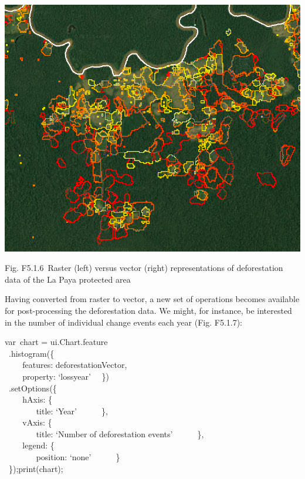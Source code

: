 \documentclass[
  letterpaper,
  DIV=11,
  numbers=noendperiod]{scrreprt}
\begin{document}
\includegraphics{./F5/image13.png}

Fig. F5.1.6~Raster (left) versus vector (right) representations of
deforestation data of the La Paya protected area

Having converted from raster to vector, a new set of operations becomes
available for post-processing the deforestation data. We might, for
instance, be interested in the number of individual change events each
year (Fig. F5.1.7):

var~chart = ui.Chart.feature\\
\hspace*{0.333em} ~.histogram(\{\\
\hspace*{0.333em} ~ ~ ~features: deforestationVector,\\
\hspace*{0.333em} ~ ~ ~property: `lossyear'~ ~\})\\
\hspace*{0.333em} ~.setOptions(\{\\
\hspace*{0.333em} ~ ~ ~hAxis: \{\\
\hspace*{0.333em} ~ ~ ~ ~ ~title: `Year'~ ~ ~ ~\},\\
\hspace*{0.333em} ~ ~ ~vAxis: \{\\
\hspace*{0.333em} ~ ~ ~ ~ ~title: `Number of deforestation events'~ ~ ~
~\},\\
\hspace*{0.333em} ~ ~ ~legend: \{\\
\hspace*{0.333em} ~ ~ ~ ~ ~position: `none'~ ~ ~ ~\}\\
\hspace*{0.333em} ~\});print(chart);
\end{document}
